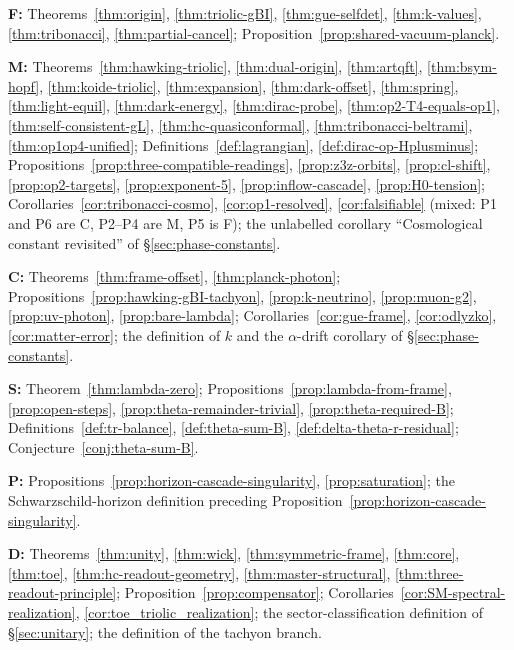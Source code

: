 \noindent\textbf{F:} Theorems~\ref{thm:origin}, \ref{thm:triolic-gBI}, \ref{thm:gue-selfdet}, \ref{thm:k-values}, \ref{thm:tribonacci},
\ref{thm:partial-cancel}; Proposition~\ref{prop:shared-vacuum-planck}.

\noindent\textbf{M:} Theorems~\ref{thm:hawking-triolic}, \ref{thm:dual-origin}, \ref{thm:artqft}, \ref{thm:bsym-hopf},
\ref{thm:koide-triolic}, \ref{thm:expansion}, \ref{thm:dark-offset}, \ref{thm:spring}, \ref{thm:light-equil}, \ref{thm:dark-energy},
\ref{thm:dirac-probe}, \ref{thm:op2-T4-equals-op1}, \ref{thm:self-consistent-gL}, \ref{thm:hc-quasiconformal},
\ref{thm:tribonacci-beltrami}, \ref{thm:op1op4-unified}; Definitions~\ref{def:lagrangian}, \ref{def:dirac-op-Hplusminus};
Propositions~\ref{prop:three-compatible-readings}, \ref{prop:z3z-orbits}, \ref{prop:cl-shift}, \ref{prop:op2-targets},
\ref{prop:exponent-5}, \ref{prop:inflow-cascade}, \ref{prop:H0-tension}; Corollaries~\ref{cor:tribonacci-cosmo},
\ref{cor:op1-resolved}, \ref{cor:falsifiable} (mixed: P1 and P6 are C, P2--P4 are M, P5 is F); the unlabelled corollary
``Cosmological constant revisited'' of \S\ref{sec:phase-constants}.

\noindent\textbf{C:} Theorems~\ref{thm:frame-offset}, \ref{thm:planck-photon}; Propositions~\ref{prop:hawking-gBI-tachyon},
\ref{prop:k-neutrino}, \ref{prop:muon-g2}, \ref{prop:uv-photon}, \ref{prop:bare-lambda}; Corollaries~\ref{cor:gue-frame},
\ref{cor:odlyzko}, \ref{cor:matter-error}; the definition of \(k\) and the \(\alpha\)-drift corollary of \S\ref{sec:phase-constants}.

\noindent\textbf{S:} Theorem~\ref{thm:lambda-zero}; Propositions~\ref{prop:lambda-from-frame}, \ref{prop:open-steps},
\ref{prop:theta-remainder-trivial}, \ref{prop:theta-required-B}; Definitions~\ref{def:tr-balance}, \ref{def:theta-sum-B},
\ref{def:delta-theta-r-residual}; Conjecture~\ref{conj:theta-sum-B}.

\noindent\textbf{P:} Propositions~\ref{prop:horizon-cascade-singularity}, \ref{prop:saturation}; the Schwarzschild-horizon definition
preceding Proposition~\ref{prop:horizon-cascade-singularity}.

\noindent\textbf{D:} Theorems~\ref{thm:unity}, \ref{thm:wick}, \ref{thm:symmetric-frame}, \ref{thm:core}, \ref{thm:toe},
\ref{thm:hc-readout-geometry}, \ref{thm:master-structural}, \ref{thm:three-readout-principle}; Proposition~\ref{prop:compensator};
Corollaries~\ref{cor:SM-spectral-realization}, \ref{cor:toe_triolic_realization}; the sector-classification definition of
\S\ref{sec:unitary}; the definition of the tachyon branch.


